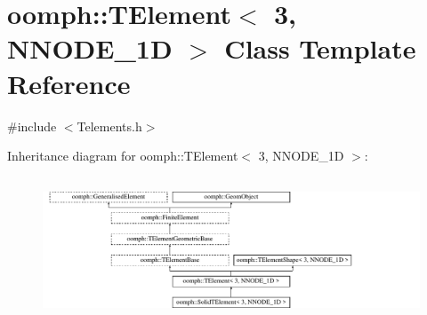 \hypertarget{classoomph_1_1TElement_3_013_00_01NNODE__1D_01_4}{}\section{oomph\+:\+:T\+Element$<$ 3, N\+N\+O\+D\+E\+\_\+1D $>$ Class Template Reference}
\label{classoomph_1_1TElement_3_013_00_01NNODE__1D_01_4}


{\ttfamily \#include $<$Telements.\+h$>$}

Inheritance diagram for oomph\+:\+:T\+Element$<$ 3, N\+N\+O\+D\+E\+\_\+1D $>$\+:\begin{figure}[H]
\begin{center}
\leavevmode
\includegraphics[height=4.341085cm]{classoomph_1_1TElement_3_013_00_01NNODE__1D_01_4}
\end{center}
\end{figure}
